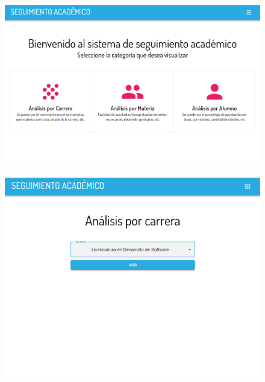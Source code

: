 \begin{figure}[!htbp]
  \centering
    \includegraphics[scale=0.3]{images/seguimiento-academico/sa-home.png}
  \label{fig:sa-home}
\end{figure}

\begin{figure}[!htbp]
  \centering
    \includegraphics[scale=0.3]{images/seguimiento-academico/sa-form-carrera.png}
  \label{fig:sa-carrera}
\end{figure}

